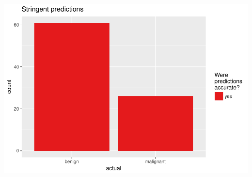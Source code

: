 \documentclass[]{article}
\begin{document}
\includegraphics{webinar_code_files/figure-latex/unnamed-chunk-62-2.pdf}
\end{document}
